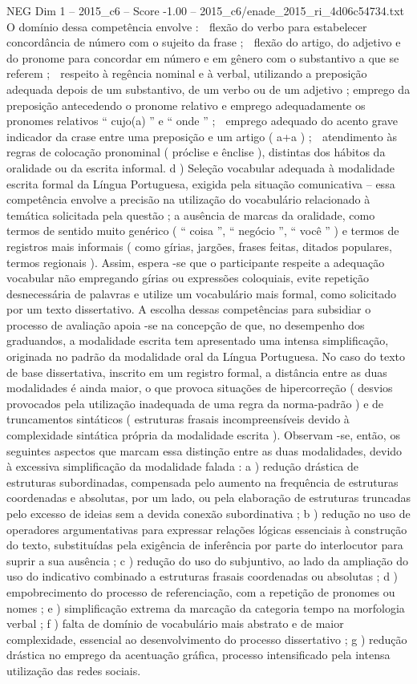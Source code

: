 \begin{textsample}{NEG Dim 1 – 2015\_c6 – Score -1.00 – 2015\_c6/enade\_2015\_ri\_4d06c54734.txt}
O domínio dessa competência envolve :  flexão do verbo para estabelecer concordância de número com o sujeito da frase ;  flexão do artigo, do adjetivo e do pronome para concordar em número e em gênero com o substantivo a que se referem ;  respeito à regência nominal e à verbal, utilizando a preposição adequada depois de um substantivo, de um verbo ou de um adjetivo ; emprego da preposição antecedendo o pronome relativo e emprego adequadamente os pronomes relativos “ cujo(a) ” e “ onde ” ;  emprego adequado do acento grave indicador da crase entre uma preposição e um artigo ( a+a ) ;  atendimento às regras de colocação pronominal ( próclise e ênclise ), distintas dos hábitos da oralidade ou da escrita informal. d ) Seleção vocabular adequada à modalidade escrita formal da Língua Portuguesa, exigida pela situação comunicativa – essa competência envolve a precisão na utilização do vocabulário relacionado à temática solicitada pela questão ; a ausência de marcas da oralidade, como termos de sentido muito genérico ( “ coisa ”, “ negócio ”, “ você ” ) e termos de registros mais informais ( como gírias, jargões, frases feitas, ditados populares, termos regionais ).
Assim, espera -se que o participante respeite a adequação vocabular não empregando gírias ou expressões coloquiais, evite repetição desnecessária de palavras e utilize um vocabulário mais formal, como solicitado por um texto dissertativo.
A escolha dessas competências para subsidiar o processo de avaliação apoia -se na concepção de que, no desempenho dos graduandos, a modalidade escrita tem apresentado uma intensa simplificação, originada no padrão da modalidade oral da Língua Portuguesa.
No caso do texto de base dissertativa, inscrito em um registro formal, a distância entre as duas modalidades é ainda maior, o que provoca situações de hipercorreção ( desvios provocados pela utilização inadequada de uma regra da norma-padrão ) e de truncamentos sintáticos ( estruturas frasais incompreensíveis devido à complexidade sintática própria da modalidade escrita ).
Observam -se, então, os seguintes aspectos que marcam essa distinção entre as duas modalidades, devido à excessiva simplificação da modalidade falada : a ) redução drástica de estruturas subordinadas, compensada pelo aumento na frequência de estruturas coordenadas e absolutas, por um lado, ou pela elaboração de estruturas truncadas pelo excesso de ideias sem a devida conexão subordinativa ; b ) redução no uso de operadores argumentativas para expressar relações lógicas essenciais à construção do texto, substituídas pela exigência de inferência por parte do interlocutor para suprir a sua ausência ; c ) redução do uso do subjuntivo, ao lado da ampliação do uso do indicativo combinado a estruturas frasais coordenadas ou absolutas ; d ) empobrecimento do processo de referenciação, com a repetição de pronomes ou nomes ; e ) simplificação extrema da marcação da categoria tempo na morfologia verbal ; f ) falta de domínio de vocabulário mais abstrato e de maior complexidade, essencial ao desenvolvimento do processo dissertativo ; g ) redução drástica no emprego da acentuação gráfica, processo intensificado pela intensa utilização das redes sociais.

\end{textsample}
